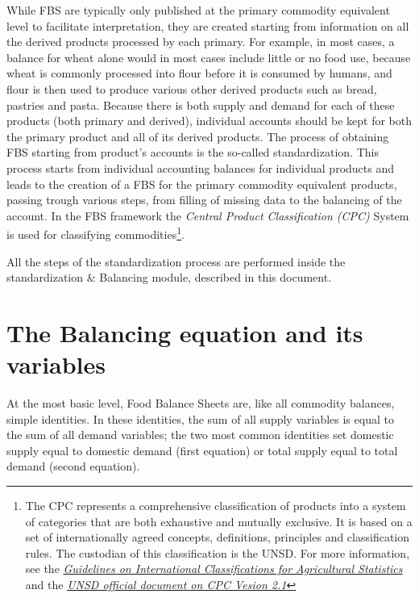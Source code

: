 \documentclass[]{article}
\let\rmarkdownfootnote\footnote%
\def\footnote{\protect\rmarkdownfootnote}
\begin{document}
While FBS are typically only published at the primary commodity
equivalent level to facilitate interpretation, they are created starting
from information on all the derived products processed by each primary.
For example, in most cases, a balance for wheat alone would in most
cases include little or no food use, because wheat is commonly processed
into flour before it is consumed by humans, and flour is then used to
produce various other derived products such as bread, pastries and
pasta. Because there is both supply and demand for each of these
products (both primary and derived), individual accounts should be kept
for both the primary product and all of its derived products. The
process of obtaining FBS starting from product's accounts is the
so-called standardization. This process starts from individual
accounting balances for individual products and leads to the creation of
a FBS for the primary commodity equivalent products, passing trough
various steps, from filling of missing data to the balancing of the
account. In the FBS framework the \emph{Central Product Classification
(CPC)} System is used for classifying commodities\footnote{The CPC
  represents a comprehensive classification of products into a system of
  categories that are both exhaustive and mutually exclusive. It is
  based on a set of internationally agreed concepts, definitions,
  principles and classification rules. The custodian of this
  classification is the UNSD. For more information, see the
  \href{http://gsars.org/wp-content/uploads/2015/12/Guidelines-for-Int-Classifications-on-Agricultural-Statistics-web.pdf}{\emph{Guidelines
  on International Classifications for Agricultural Statistics}} and the
  \href{https://unstats.un.org/unsd/cr/downloads/CPCv2.1_complete\%28PDF\%29_English.pdf}{\emph{UNSD
  official document on CPC Vesion 2.1}}}.

All the steps of the standardization process are performed inside the
standardization \& Balancing module, described in this document.

\section*{The Balancing equation and its
variables}\label{the-balancing-equation-and-its-variables}

At the most basic level, Food Balance Sheets are, like all commodity
balances, simple identities. In these identities, the sum of all supply
variables is equal to the sum of all demand variables; the two most
common identities set domestic supply equal to domestic demand (first
equation) or total supply equal to total demand (second equation).
\end{document}
